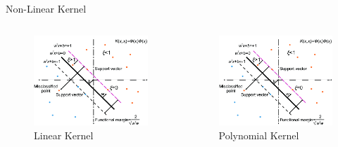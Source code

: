 \begin{frame}[fragile]{Non-Linear Kernel}
  \begin{columns}[onlytextwidth, T, c]
    \begin{column}{.5\textwidth}
        \begin{figure}
            \includegraphics[width=5cm]{assets/images/test.png}
            \caption{Linear Kernel}
        \end{figure}
    \end{column}
    \begin{column}{.5\textwidth}
        \begin{figure}
            \includegraphics[width=5cm]{assets/images/test.png}
            \caption{Polynomial Kernel}
        \end{figure}
    \end{column}    
  \end{columns}
\end{frame}
